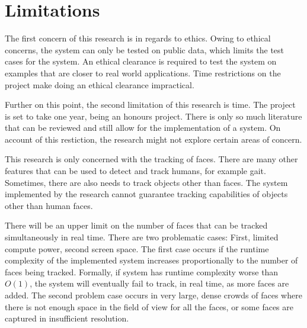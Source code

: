 \section{Limitations}
  The first concern of this research is in regards to ethics.
  Owing to ethical concerns, the system can only be tested on public data, which limits the test cases for the system.
  An ethical clearance is required to test the system on examples that are closer to real world applications.
  Time restrictions on the project make doing an ethical clearance impractical.

  Further on this point, the second limitation of this research is time.
  The project is set to take one year, being an honours project.
  There is only so much literature that can be reviewed and still allow for the implementation of a system.
  On account of this restiction, the research might not explore certain areas of concern.

  This research is only concerned with the tracking of faces.
  There are many other features that can be used to detect and track humans, for example gait. 
  Sometimes, there are also needs to track objects other than faces. 
  The system implemented by the research cannot guarantee tracking capabilities of objects other than human faces.

  There will be an upper limit on the number of faces that can be tracked simultaneously in real time.
  There are two problematic cases: First, limited compute power, second screen space.
  The first case occurs if the runtime complexity of the implemented system increases proportionally to the number of faces being tracked.
  Formally, if system has runtime complexity worse than $O(1)$, the system will eventually fail to track, in real time, as more faces are added.
  The second problem case occurs in very large, dense crowds of faces where there is not enough space in the field of view for all the faces, or some faces are captured in insufficient resolution.
